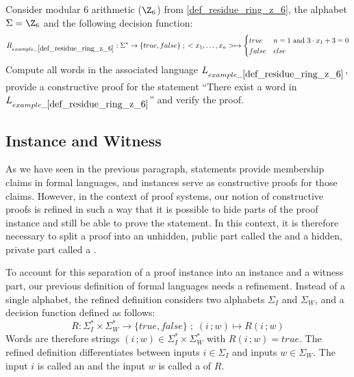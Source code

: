 \begin{exercise} Consider modular $6$ arithmetic ($\Z_6$) from  \examplename{} \ref{def_residue_ring_z_6}, the alphabet $\Sigma = \Z_6$ and the following decision function:
\begin{equation*}
R_{example\_\ref{def_residue_ring_z_6}} : \Sigma^*\to \{true, false\}\;;\;
<x_1,\ldots,x_n> \mapsto
\begin{cases}
true & n=1 \text{ and } 3\cdot x_1 + 3 = 0\\
false & else
\end{cases}
\end{equation*}
Compute all words in the associated language $L_{example\_\ref{def_residue_ring_z_6}}$, provide a constructive proof for the statement ``There exist a word in $L_{example\_\ref{def_residue_ring_z_6}}$'' and verify the proof.
\end{exercise}

\subsection{Instance and Witness}
As we have seen in the previous paragraph, statements provide membership claims in formal languages, and instances serve as constructive proofs for those claims. However, in the context of  proof systems, our notion of constructive proofs is refined in such a way that  it is possible to hide parts of the proof instance and still be able to prove the statement. In this context, it is therefore necessary to split a proof into an unhidden, public part called the  and a hidden, private part called a .

To account for this separation of a proof instance into an instance and a witness part, our previous definition of formal languages needs a refinement. Instead of a single alphabet, the refined definition considers two alphabets $\Sigma_I$ and $\Sigma_W$, and a decision function defined as follows:
\begin{equation}
R: \Sigma_I^* \times \Sigma_W^* \to \{true, false\}\;;\; (i\,;w) \mapsto R(i\,;w)
\end{equation}
Words are therefore strings $(i\,;w)\in \Sigma_I^* \times \Sigma_W^*$ with $R(i\,;w)=true$. The refined definition differentiates between inputs $i\in \Sigma_I$ and inputs $w\in \Sigma_W$. The input $i$ is called an  and the input $w$ is called a  of $R$. 

